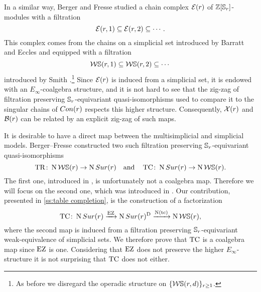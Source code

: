 In a similar way, Berger and Fresse \cite{berger2004combinatorial} studied a chain complex $\mathcal{E}(r)$ of $\mathbb{Z}[\mathbb{S}_r]$-modules with a filtration
\[
\mathcal{E}(r,1) \subseteq \mathcal{E}(r,2) \subseteq \dotsb \,.
\]
This complex comes from the chains on a simplicial set introduced by Barratt and Eccles \cite{barrat1974operad} and equipped with a filtration
\[
\mathcal{W}\mathbb{S}(r,1) \subseteq \mathcal{W}\mathbb{S}(r,2) \subseteq \dotsb
\]
introduced by Smith \cite{smith1989filtration}.\footnote{As before we disregard the operadic structure on $\{\mathcal{W}\mathbb{S}(r,d)\}_{r \geq 1}$.}
Since $\mathcal{E}(r)$ is induced from a simplicial set, it is endowed with an $E_\infty$-coalgebra structure, and it is not hard to see that the zig-zag of filtration preserving $\mathbb{S}_r$-equivariant quasi-isomorphisms used to compare it to the singular chains of $Con(r)$ respects this higher structure.
Consequently, $\mathcal{X}(r)$ and $\mathcal{B}(r)$ can be related by an explicit zig-zag of such maps.

It is desirable to have a direct map between the multisimplicial and simplicial models.
Berger--Fresse constructed two such filtration preserving $\mathbb{S}_r$-equivariant quasi-isomorphisms
\[
\operatorname{TR} \colon \operatorname{N}\mathcal{W}\mathbb{S}(r) \to \operatorname{N}Sur(r)
\quad \text{and} \quad
\operatorname{TC} \colon \operatorname{N}Sur(r) \to \operatorname{N} \mathcal{W}\mathbb{S}(r).
\]
The first one, introduced in \cite[1$\cdot$3]{berger2004combinatorial}, is unfortunately not a coalgebra map.
Therefore we will focus on the second one, which was introduced in \cite{berger2002prismatic}.
Our contribution, presented in \cref{ss:table completion}, is the construction of a factorization
\[
\operatorname{TC} \colon \operatorname{N}Sur(r) \xrightarrow{\operatorname{EZ}} \operatorname{N}Sur(r)^{\mathrm{D}} \xrightarrow{\operatorname{N}(\operatorname{tc})} \operatorname{N} \mathcal{W}\mathbb{S}(r),
\]
where the second map is induced from a filtration preserving $\mathbb{S}_r$-equivariant weak-equivalence of simplicial sets.
We therefore prove that $\operatorname{TC}$ is a coalgebra map since $\operatorname{EZ}$ is one.
Considering that $\operatorname{EZ}$ does not preserve the higher $E_\infty$-structure it is not surprising that $\operatorname{TC}$ does not either.